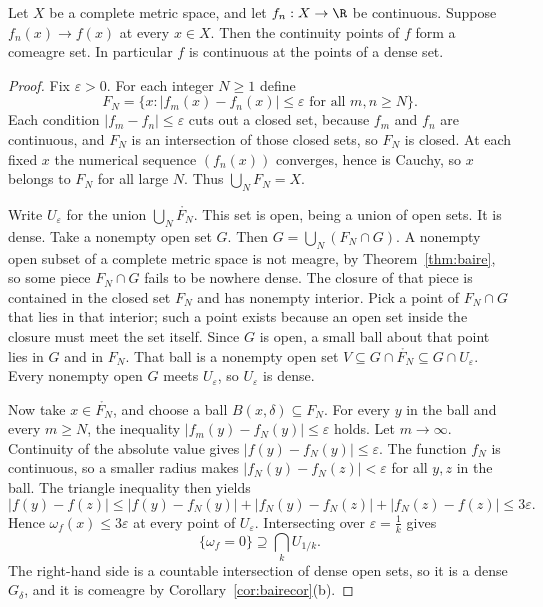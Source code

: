 \begin{theorem}[Baire, 1899]\label{thm:baireclassone}
Let $X$ be a complete metric space, and let $f_n:X\to\R$ be continuous. Suppose $f_n(x)\to f(x)$ at every $x\in X$. Then the continuity points of $f$ form a comeagre set. In particular $f$ is continuous at the points of a dense set.
\end{theorem}
\begin{proof}
Fix $\varepsilon>0$. For each integer $N\ge1$ define
\[F_N=\{x:|f_m(x)-f_n(x)|\le\varepsilon\text{ for all }m,n\ge N\}.\]
Each condition $|f_m-f_n|\le\varepsilon$ cuts out a closed set, because $f_m$ and $f_n$ are continuous, and $F_N$ is an intersection of those closed sets, so $F_N$ is closed. At each fixed $x$ the numerical sequence $(f_n(x))$ converges, hence is Cauchy, so $x$ belongs to $F_N$ for all large $N$. Thus $\bigcup_N F_N=X$.

Write $U_\varepsilon$ for the union $\bigcup_N\mathring{F_N}$. This set is open, being a union of open sets. It is dense. Take a nonempty open set $G$. Then $G=\bigcup_N(F_N\cap G)$. A nonempty open subset of a complete metric space is not meagre, by Theorem~\ref{thm:baire}, so some piece $F_N\cap G$ fails to be nowhere dense. The closure of that piece is contained in the closed set $F_N$ and has nonempty interior. Pick a point of $F_N\cap G$ that lies in that interior; such a point exists because an open set inside the closure must meet the set itself. Since $G$ is open, a small ball about that point lies in $G$ and in $F_N$. That ball is a nonempty open set $V\subseteq G\cap\mathring{F_N}\subseteq G\cap U_\varepsilon$. Every nonempty open $G$ meets $U_\varepsilon$, so $U_\varepsilon$ is dense.

Now take $x\in\mathring{F_N}$, and choose a ball $B(x,\delta)\subseteq F_N$. For every $y$ in the ball and every $m\ge N$, the inequality $|f_m(y)-f_N(y)|\le\varepsilon$ holds. Let $m\to\infty$. Continuity of the absolute value gives $|f(y)-f_N(y)|\le\varepsilon$. The function $f_N$ is continuous, so a smaller radius makes $|f_N(y)-f_N(z)|<\varepsilon$ for all $y,z$ in the ball. The triangle inequality then yields
\[|f(y)-f(z)|\le|f(y)-f_N(y)|+|f_N(y)-f_N(z)|+|f_N(z)-f(z)|\le3\varepsilon.\]
Hence $\omega_f(x)\le3\varepsilon$ at every point of $U_\varepsilon$. Intersecting over $\varepsilon=\frac1k$ gives
\[\{\omega_f=0\}\supseteq\bigcap_k U_{1/k}.\]
The right-hand side is a countable intersection of dense open sets, so it is a dense $G_\delta$, and it is comeagre by Corollary~\ref{cor:bairecor}(b).
\end{proof}

